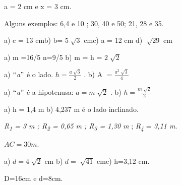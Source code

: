 \begin{respostas}{3}

\ansitem{} a = 2 cm e x = 3 cm.

\ansitem{} Alguns exemplos: 6,4 e 10 ;  30, 40 e 50;  21, 28 e 35.

\ansitem{} a) c = 13 cm\tab b) b= \( 5\sqrt[]{3} \) cm\tab c) a = 12 cm   \tab d)  \( \sqrt[]{29} \)  cm

\ansitem{} a) m =16/5  n=9/5       \tab  b)   m = h =  \( 2\sqrt[]{2} \)

\ansitem{} a) $``$\textit{a}$"$  é o lado.  \( h=\frac{a\sqrt[]{3}}{2} \) .    \tab b) A \( =\frac{a^{2}\sqrt[]{3}}{4} \)

\ansitem{} a) $``$\textit{a}$"$  é a hipotenusa:  \( a=m\sqrt[]{2} \) .     \tab b)  \( h=\frac{m\sqrt[]{2}}{2} \)

\ansitem{} a) h = 1,4 m  \tab b) 4,237 m é o lado inclinado.  

\ansitem{}  \textit{R\textsubscript{1} = 3 m ;  R\textsubscript{2} = 0,65 m ; R\textsubscript{3}  = 1,30 m   } ; \textit{  R\textsubscript{4}} = \textit{3,11 m}.


\ansitem{}  \( AC=30 m.  \)

\ansitem{} a)  \( d=4\sqrt[]{2} \)   cm  \tab b)  \( d=\sqrt[]{41} \)  cm\tab c) h=3,12 cm.

\ansitem{} D=16cm e d=8cm.
\end{respostas}

